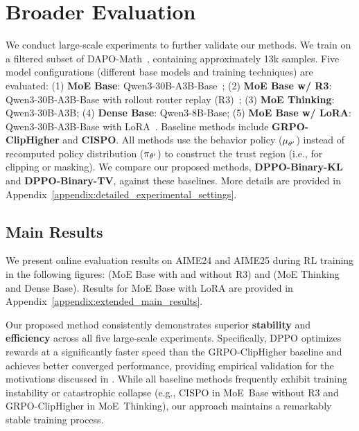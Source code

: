 \section{Broader Evaluation}
\label{sec:scaling_exp}


We conduct large-scale experiments to further validate our methods. We train on a filtered subset of DAPO-Math~\citep{li2026optimal}, containing approximately 13k samples. Five model configurations (different base models and training techniques) are evaluated: (1) \textbf{MoE Base}: Qwen3-30B-A3B-Base~\citep{yang2025qwen3}; (2) \textbf{MoE Base w/ R3}: Qwen3-30B-A3B-Base with rollout router replay (R3)~\citep{ma2025stabilizing}; (3) \textbf{MoE Thinking}: Qwen3-30B-A3B; (4) \textbf{Dense Base}: Qwen3-8B-Base; (5) \textbf{MoE Base w/ LoRA}: Qwen3-30B-A3B-Base with LoRA~\citep{hu2022lora}. Baseline methods include \textbf{GRPO-ClipHigher}\citep{shao2024deepseekmath, liu2025understanding, yu2025dapo} and \textbf{CISPO}\citep{chen2025minimax, khatri2025art}. 
All methods use the behavior policy ($\operatorname*{{\textcolor{black}{\mu}}}_{\theta'}$) instead of recomputed policy distribution ($\operatorname*{{\textcolor{black}{\pi}}}_{\theta'}$) to construct the trust region (i.e., for clipping or masking). We compare our proposed methods, \textbf{DPPO-Binary-KL} and \textbf{DPPO-Binary-TV}, against these baselines. More details are provided in Appendix~\ref{appendix:detailed_experimental_settings}.

\subsection{Main Results}
We present online evaluation results on AIME24 and AIME25 \citep{AIME} during RL training in the following figures:  (MoE Base with and without R3) and  (MoE Thinking and Dense Base). Results for MoE Base with LoRA are provided in Appendix~\ref{appendix:extended_main_results}.

Our proposed method consistently demonstrates superior \textbf{stability} and \textbf{efficiency} across all five large-scale experiments. Specifically, DPPO optimizes rewards at a significantly faster speed than the GRPO-ClipHigher baseline and achieves better converged performance, providing empirical validation for the motivations discussed in . While all baseline methods frequently exhibit training instability or catastrophic collapse (e.g., CISPO in MoE~Base without R3 and GRPO-ClipHigher in MoE~Thinking), our approach maintains a remarkably stable training process.

